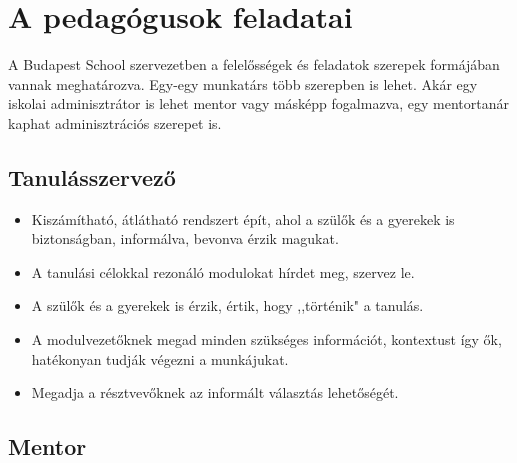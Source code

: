 


\section{A pedagógusok feladatai}\label{sec:tanarfeladatok}

A Budapest School szervezetben a felelősségek és feladatok szerepek formájában vannak
meghatározva. Egy-egy munkatárs több szerepben is lehet. Akár egy iskolai adminisztrátor is lehet mentor vagy
másképp fogalmazva, egy mentortanár kaphat adminisztrációs szerepet is. 


\subsection{Tanulásszervező}\label{sec:tanulasszervezo}
\begin{itemize}
\item Kiszámítható, átlátható rendszert épít, ahol a szülők és a gyerekek is biztonságban, informálva, bevonva érzik magukat.
\item A tanulási célokkal rezonáló modulokat hírdet meg, szervez le.
\item A szülők és a gyerekek is érzik, értik, hogy ,,történik" a tanulás.
\item A modulvezetőknek megad minden szükséges információt, kontextust így ők, hatékonyan tudják végezni a munkájukat.
\item Megadja a résztvevőknek az informált választás lehetőségét.
\end{itemize}

\subsection{Mentor}\label{mentor}


